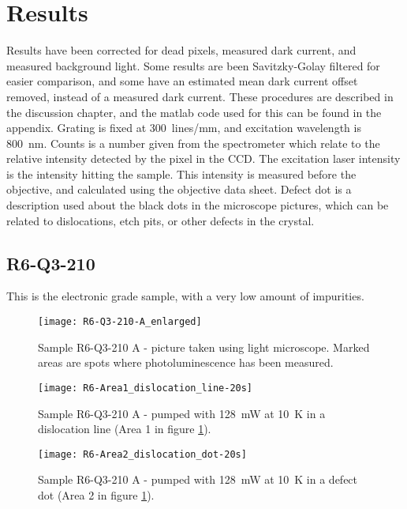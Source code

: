 \section{Results}

Results have been corrected for dead pixels, measured dark current, and measured background light. Some results are been Savitzky-Golay filtered for easier comparison, and some have an estimated mean dark current offset removed, instead of a measured dark current. These procedures are described in the discussion chapter, and the matlab code used for this can be found in the appendix. Grating is fixed at 300~lines/mm, and excitation wavelength is 800~nm. Counts is a number given from the spectrometer which relate to the relative intensity detected by the pixel in the CCD. The excitation laser intensity is the intensity hitting the sample. This intensity is measured before the objective, and calculated using the objective data sheet. Defect dot is a description used about the black dots in the microscope pictures, which can be related to dislocations, etch pits, or other defects in the crystal.

\subsection{R6-Q3-210}

This is the electronic grade sample, with a very low amount of impurities.

\begin{figure}[H]
\centering
\texttt{[image: R6-Q3-210-A\_enlarged]}
\caption[R6-Q3-210 A from light microscope]{Sample R6-Q3-210 A - picture taken using light microscope. Marked areas are spots where photoluminescence has been measured.}
\label{fig:R6-Q3-210-A_enlarged}%
\end{figure}


\begin{figure}[H]
\centering
\texttt{[image: R6-Area1\_dislocation\_line-20s]}
\caption[R6-Q3-210 at a dislocation line]{Sample R6-Q3-210 A - pumped with 128~mW at 10~K in a dislocation line (Area 1 in figure \ref{fig:R6-Q3-210-A_enlarged}).}
\label{fig:R6-Area1_dislocation_line-20s}%
\end{figure}


\begin{figure}[H]
\centering
\texttt{[image: R6-Area2\_dislocation\_dot-20s]}
\caption[R6-Q3-210 at a defect dot]{Sample R6-Q3-210 A - pumped with 128~mW at 10~K in a defect dot (Area 2 in figure \ref{fig:R6-Q3-210-A_enlarged}).}
\label{fig:R6-Area2_dislocation_dot-20s}%
\end{figure}


